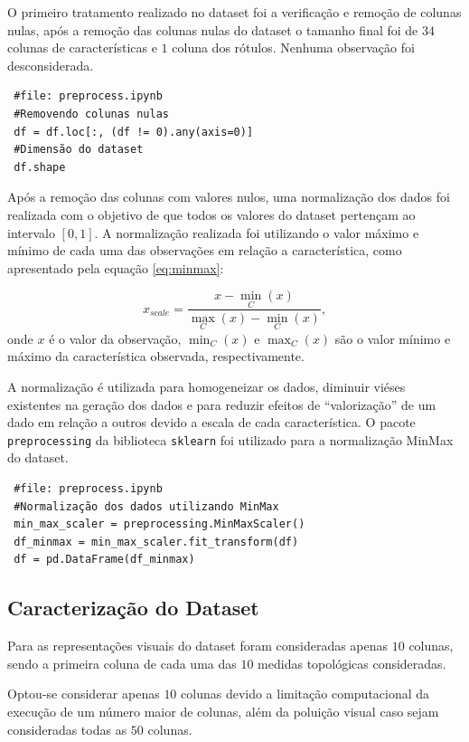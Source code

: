\documentclass[
	article,			%
	11pt,				%
	oneside,			%
	a4paper,			%
	english,			%
	brazil,				%
	sumario=tradicional
	]{abntex2}
\begin{document}
O primeiro tratamento realizado no dataset foi a verificação e remoção de colunas nulas, após a remoção das colunas nulas do dataset o tamanho final foi de $34$ colunas de características e $1$ coluna dos rótulos. Nenhuma observação foi desconsiderada.

\begin{verbatim}
 #file: preprocess.ipynb
 #Removendo colunas nulas
 df = df.loc[:, (df != 0).any(axis=0)]
 #Dimensão do dataset
 df.shape
\end{verbatim}

Após a remoção das colunas com valores nulos, uma normalização dos dados foi realizada com o objetivo de que todos os valores do dataset pertençam ao intervalo $[0,1]$. A normalização realizada foi utilizando o valor máximo e mínimo de cada uma das observações em relação a característica, como apresentado pela equação \ref{eq:minmax}:

\begin{equation}
\label{eq:minmax}
 x_{scale} = \frac{x - \min_{C}{(x)}}{\max_{C}{(x)}-\min_{C}{(x)}},
\end{equation}
onde $x$ é o valor da observação, $\min_{C}{(x)}$ e $\max_{C}{(x)}$ são o valor mínimo e máximo da característica observada, respectivamente.

A normalização é utilizada para homogeneizar os dados, diminuir viéses existentes na geração dos dados e para reduzir efeitos de ``valorização'' de um dado em relação a outros devido a escala de cada característica. O pacote \verb|preprocessing| da biblioteca \verb|sklearn| foi utilizado para a normalização MinMax do dataset.

\begin{verbatim}
 #file: preprocess.ipynb
 #Normalização dos dados utilizando MinMax
 min_max_scaler = preprocessing.MinMaxScaler()
 df_minmax = min_max_scaler.fit_transform(df)
 df = pd.DataFrame(df_minmax)
\end{verbatim}


\subsection{Caracterização do Dataset}

Para as representações visuais do dataset foram consideradas apenas $10$ colunas, sendo a primeira coluna de cada uma das $10$ medidas topológicas consideradas.

Optou-se considerar apenas $10$ colunas devido a limitação computacional da execução de um número maior de colunas, além da poluição visual caso sejam consideradas todas as $50$ colunas.
\end{document}
